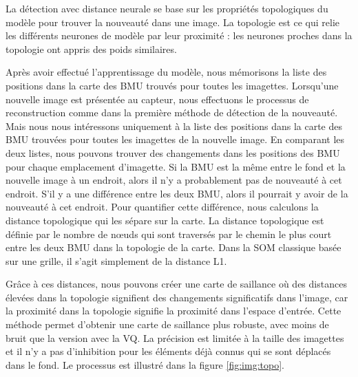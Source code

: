 	La détection avec distance neurale se base sur les propriétés topologiques du modèle pour trouver la nouveauté dans une image. La topologie est ce qui relie les différents neurones de modèle par leur proximité : les neurones proches dans la topologie ont appris des poids similaires.

	Après avoir effectué l'apprentissage du modèle, nous mémorisons la liste des positions dans la carte des BMU trouvés pour toutes les imagettes. Lorsqu'une nouvelle image est présentée au capteur, nous effectuons le processus de reconstruction comme dans la première méthode de détection de la nouveauté. Mais nous nous intéressons uniquement à la liste des positions dans la carte des BMU trouvées pour toutes les imagettes de la nouvelle image. En comparant les deux listes, nous pouvons trouver des changements dans les positions des BMU pour chaque emplacement d'imagette. Si la BMU est la même entre le fond et la nouvelle image à un endroit, alors il n'y a probablement pas de nouveauté à cet endroit. S'il y a une différence entre les deux BMU, alors il pourrait y avoir de la nouveauté à cet endroit. Pour quantifier cette différence, nous calculons la distance topologique qui les sépare sur la carte. La distance topologique est définie par le nombre de nœuds qui sont traversés par le chemin le plus court entre les deux BMU dans la topologie de la carte. Dans la SOM classique basée sur une grille, il s'agit simplement de la distance L1.

	Grâce à ces distances, nous pouvons créer une carte de saillance où des distances élevées dans la topologie signifient des changements significatifs dans l'image, car la proximité dans la topologie signifie la proximité dans l'espace d'entrée. Cette méthode permet d'obtenir une carte de saillance plus robuste, avec moins de bruit que la version avec la VQ. La précision est limitée à la taille des imagettes et il n'y a pas d'inhibition pour les éléments déjà connus qui se sont déplacés dans le fond. Le processus est illustré dans la figure \ref{fig:img:topo}.

